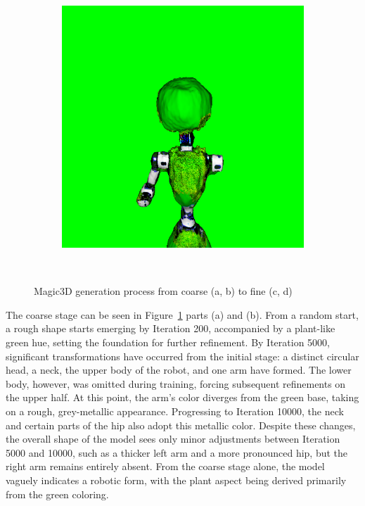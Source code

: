 \begin{figure}[ht]
\begin{subfigure}[b]{0.2\textwidth}
        \includegraphics[width=\textwidth]{etc/a robot made out of plants/magic3d/magic3D_refine_robot_10000_part1.png}
        \caption{}
    \end{subfigure}
    \caption{Magic3D generation process from coarse (a, b) to fine (c, d)}~\label{fig:generationMagic3D}
\end{figure} 

The coarse stage can be seen in Figure~\ref{fig:generationMagic3D} parts (a) and (b). From a random start, a rough shape starts emerging by Iteration 200, accompanied by a plant-like green hue, setting the foundation for further refinement. By Iteration 5000, significant transformations have occurred from the initial stage: a distinct circular head, a neck, the upper body of the robot, and one arm have formed. The lower body, however, was omitted during training, forcing subsequent refinements on the upper half. At this point, the arm's color diverges from the green base, taking on a rough, grey-metallic appearance. Progressing to Iteration 10000, the neck and certain parts of the hip also adopt this metallic color. Despite these changes, the overall shape of the model sees only minor adjustments between Iteration 5000 and 10000, such as a thicker left arm and a more pronounced hip, but the right arm remains entirely absent. From the coarse stage alone, the model vaguely indicates a robotic form, with the plant aspect being derived primarily from the green coloring.

